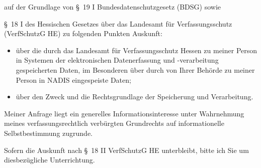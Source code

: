 auf der Grundlage von §~19 I Bundesdatenschutzgesetz (BDSG) sowie

§~18 I des Hessischen Gesetzes über das Landesamt für Verfassungsschutz
(VerfSchutzG HE) zu folgenden Punkten Auskunft:

\begin{itemize}
  \item über die durch das Landesamt für Verfassungsschutz Hessen zu meiner Person
  in Systemen der elektronischen Datenerfassung und -verarbeitung gespeicherten
  Daten, im Besonderen über durch von Ihrer Behörde zu meiner Person in NADIS
  eingespeiste Daten;

  \item über den Zweck und die Rechtsgrundlage der Speicherung und Verarbeitung.
\end{itemize}

Meiner Anfrage liegt ein generelles Informationsinteresse unter Wahrnehmung
meines verfassungsrechtlich verbürgten Grundrechts auf informationelle
Selbstbestimmung zugrunde.

Sofern die Auskunft nach §~18 II VerfSchutzG HE unterbleibt, bitte ich Sie um
diesbezügliche Unterrichtung.
